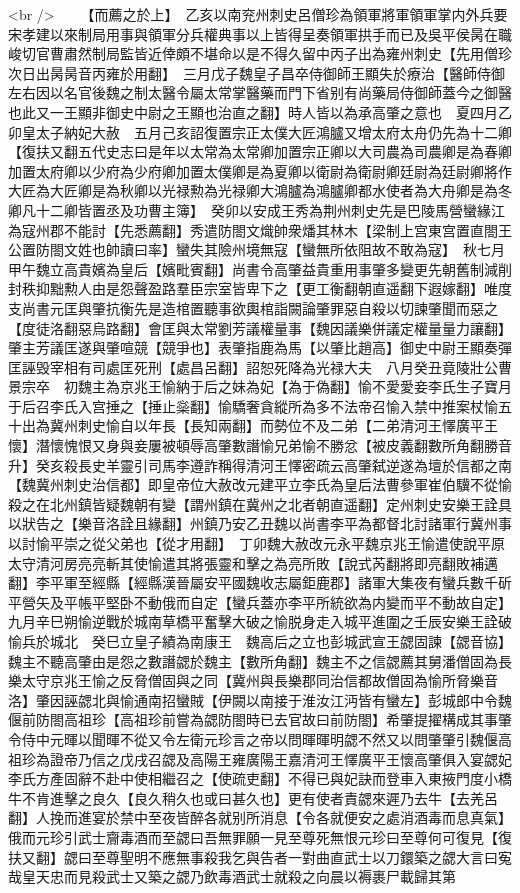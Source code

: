 <br />
　　【而薦之於上】　乙亥以南兖州刺史呂僧珍為領軍將軍領軍掌内外兵要宋孝建以來制局用事與領軍分兵權典事以上皆得呈奏領軍拱手而已及吳平侯昺在職峻切官曹肅然制局監皆近倖頗不堪命以是不得久留中丙子出為雍州刺史【先用僧珍次日出昺昺音丙雍於用翻】　三月戊子魏皇子昌卒侍御師王顯失於療治【醫師侍御左右因以名官後魏之制太醫令屬太常掌醫藥而門下省别有尚藥局侍御師蓋今之御醫也此又一王顯非御史中尉之王顯也治直之翻】時人皆以為承高肇之意也　夏四月乙卯皇太子納妃大赦　五月己亥詔復置宗正太僕大匠鴻臚又增太府太舟仍先為十二卿【復扶又翻五代史志曰是年以太常為太常卿加置宗正卿以大司農為司農卿是為春卿加置太府卿以少府為少府卿加置太僕卿是為夏卿以衛尉為衛尉卿廷尉為廷尉卿將作大匠為大匠卿是為秋卿以光禄勲為光禄卿大鴻臚為鴻臚卿都水使者為大舟卿是為冬卿凡十二卿皆置丞及功曹主簿】　癸卯以安成王秀為荆州刺史先是巴陵馬營蠻緣江為寇州郡不能討【先悉薦翻】秀遣防閤文熾帥衆燔其林木【梁制上宫東宫置直閤王公置防閤文姓也帥讀曰率】蠻失其險州境無寇【蠻無所依阻故不敢為寇】　秋七月甲午魏立高貴嬪為皇后【嬪毗賓翻】尚書令高肇益貴重用事肇多變更先朝舊制減削封秩抑黜勲人由是怨聲盈路羣臣宗室皆卑下之【更工衡翻朝直遥翻下遐嫁翻】唯度支尚書元匡與肇抗衡先是造棺置聽事欲輿棺詣闕論肇罪惡自殺以切諫肇聞而惡之【度徒洛翻惡烏路翻】會匡與太常劉芳議權量事【魏因議樂併議定權量量力讓翻】肇主芳議匡遂與肇喧競【競爭也】表肇指鹿為馬【以肇比趙高】御史中尉王顯奏彈匡誣毁宰相有司處匡死刑【處昌呂翻】詔恕死降為光禄大夫　八月癸丑竟陵壯公曹景宗卒　初魏主為京兆王愉納于后之妹為妃【為于偽翻】愉不愛愛妾李氏生子寶月于后召李氏入宫捶之【捶止橤翻】愉驕奢貪縱所為多不法帝召愉入禁中推案杖愉五十出為冀州刺史愉自以年長【長知兩翻】而勢位不及二弟【二弟清河王懌廣平王懷】潛懷愧恨又身與妾屢被頓辱高肇數譖愉兄弟愉不勝忿【被皮義翻數所角翻勝音升】癸亥殺長史羊靈引司馬李遵詐稱得清河王懌密疏云高肇弑逆遂為壇於信都之南【魏冀州刺史治信都】即皇帝位大赦改元建平立李氏為皇后法曹參軍崔伯驥不從愉殺之在北州鎮皆疑魏朝有變【謂州鎮在冀州之北者朝直遥翻】定州刺史安樂王詮具以狀告之【樂音洛詮且緣翻】州鎮乃安乙丑魏以尚書李平為都督北討諸軍行冀州事以討愉平崇之從父弟也【從才用翻】　丁卯魏大赦改元永平魏京兆王愉遣使說平原太守清河房亮亮斬其使愉遣其將張靈和擊之為亮所敗【說式芮翻將即亮翻敗補邁翻】李平軍至經縣【經縣漢晉屬安平國魏收志屬鉅鹿郡】諸軍大集夜有蠻兵數千斫平營矢及平帳平堅卧不動俄而自定【蠻兵蓋亦李平所統欲為内變而平不動故自定】九月辛巳朔愉逆戰於城南草橋平奮擊大破之愉脱身走入城平進圍之壬辰安樂王詮破愉兵於城北　癸巳立皇子績為南康王　魏高后之立也彭城武宣王勰固諫【勰音協】魏主不聽高肇由是怨之數譖勰於魏主【數所角翻】魏主不之信勰薦其舅潘僧固為長樂太守京兆王愉之反脅僧固與之同【冀州與長樂郡同治信都故僧固為愉所脅樂音洛】肇因誣勰北與愉通南招蠻賊【伊闕以南接于淮汝江沔皆有蠻左】彭城郎中令魏偃前防閤高祖珍【高祖珍前嘗為勰防閤時已去官故曰前防閤】希肇提擢構成其事肇令侍中元暉以聞暉不從又令左衛元珍言之帝以問暉暉明勰不然又以問肇肇引魏偃高祖珍為證帝乃信之戊戌召勰及高陽王雍廣陽王嘉清河王懌廣平王懷高肇俱入宴勰妃李氏方產固辭不赴中使相繼召之【使疏吏翻】不得已與妃訣而登車入東掖門度小橋牛不肯進擊之良久【良久稍久也或曰甚久也】更有使者責勰來遲乃去牛【去羌呂翻】人挽而進宴於禁中至夜皆醉各就别所消息【令各就便安之處消酒毒而息真氣】俄而元珍引武士齎毒酒而至勰曰吾無罪願一見至尊死無恨元珍曰至尊何可復見【復扶又翻】勰曰至尊聖明不應無事殺我乞與告者一對曲直武士以刀鐶築之勰大言曰寃哉皇天忠而見殺武士又築之勰乃飲毒酒武士就殺之向晨以褥裹尸載歸其第